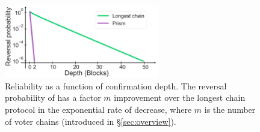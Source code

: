 


\begin{figure}
\begin{center}
\includegraphics[width=0.6\textwidth]{figures/reliability-depth.pdf}
\end{center}
\caption{\label{fig:rd} \small Reliability as a function of confirmation depth. The reversal probability of \prism has a factor $m$ improvement over the longest chain protocol in the exponential rate of decrease, where $m$ is the number of voter chains (introduced in \S\ref{sec:overview}).}
\end{figure}
